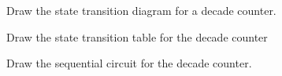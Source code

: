 %
%
\begin{problem}
Draw the state transition diagram for a decade counter.
\end{problem}
%
%
\begin{problem}
Draw the state transition table for the decade counter
\end{problem}
%
%
\begin{problem}
Draw the sequential circuit for the decade counter.
\end{problem}
%
%



